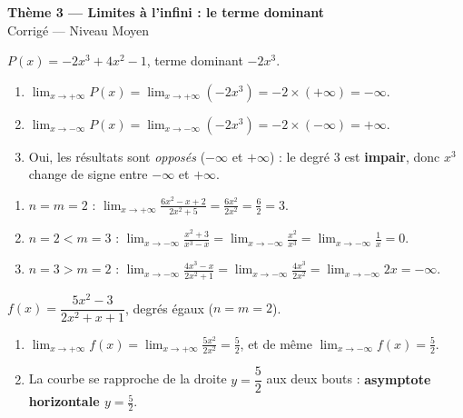 \documentclass[11pt,a4paper]{article}
\begin{document}
\begin{center}
{\Large\bfseries\color{primarydark}Thème 3 — Limites à l'infini : le terme dominant}\\[2pt]
{\large\color{excol}Corrigé — Niveau Moyen}
\end{center}
\vspace{6pt}

\begin{correction}
$P(x)=-2x^3+4x^2-1$, terme dominant $-2x^3$.
\begin{enumerate}[label=\alph*),leftmargin=2em,itemsep=3pt]
  \item $\displaystyle\lim_{x\to+\infty} P(x)=\lim_{x\to+\infty}(-2x^3)=-2\times(+\infty)=-\infty$.
  \item $\displaystyle\lim_{x\to-\infty} P(x)=\lim_{x\to-\infty}(-2x^3)=-2\times(-\infty)=+\infty$.
  \item Oui, les résultats sont \emph{opposés} ($-\infty$ et $+\infty$) : le degré $3$ est \textbf{impair},
        donc $x^3$ change de signe entre $-\infty$ et $+\infty$.
\end{enumerate}
\end{correction}

\begin{correction}
\begin{enumerate}[label=\alph*),leftmargin=2em,itemsep=3pt]
  \item $n=m=2$ : $\displaystyle\lim_{x\to+\infty}\frac{6x^2-x+2}{2x^2+5}=\frac{6x^2}{2x^2}=\frac{6}{2}=3$.
  \item $n=2<m=3$ : $\displaystyle\lim_{x\to-\infty}\frac{x^2+3}{x^3-x}=\lim_{x\to-\infty}\frac{x^2}{x^3}=\lim_{x\to-\infty}\frac{1}{x}=0$.
  \item $n=3>m=2$ : $\displaystyle\lim_{x\to-\infty}\frac{4x^3-x}{2x^2+1}=\lim_{x\to-\infty}\frac{4x^3}{2x^2}=\lim_{x\to-\infty}2x=-\infty$.
\end{enumerate}
\end{correction}

\begin{correction}
$f(x)=\dfrac{5x^2-3}{2x^2+x+1}$, degrés égaux ($n=m=2$).
\begin{enumerate}[label=\alph*),leftmargin=2em,itemsep=3pt]
  \item $\displaystyle\lim_{x\to+\infty} f(x)=\lim_{x\to+\infty}\frac{5x^2}{2x^2}=\frac{5}{2}$, et de même
        $\displaystyle\lim_{x\to-\infty} f(x)=\frac{5}{2}$.
  \item La courbe se rapproche de la droite $y=\dfrac{5}{2}$ aux deux bouts : \textbf{asymptote horizontale
        $y=\tfrac52$}.
\end{enumerate}
\end{correction}
\end{document}

